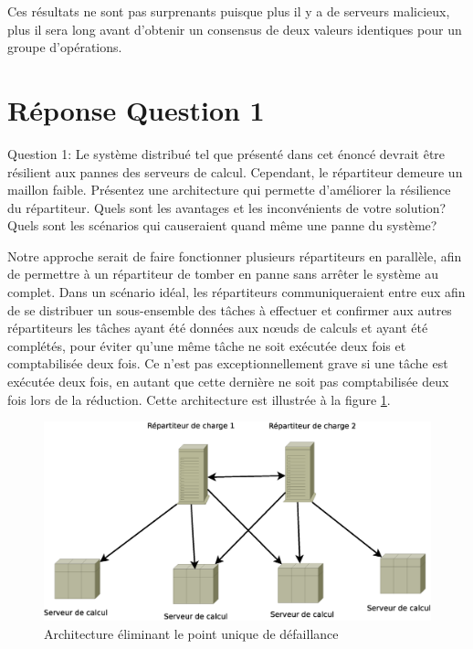 Ces résultats ne sont pas surprenants puisque plus il y a de serveurs malicieux, plus il sera long avant
d'obtenir un consensus de deux valeurs identiques pour un groupe d'opérations. 




\section{Réponse Question 1}
Question 1: Le système distribué tel que présenté dans cet énoncé devrait être résilient aux pannes
des serveurs de calcul. Cependant, le répartiteur demeure un maillon faible. Présentez une
architecture qui permette d'améliorer la résilience du répartiteur. Quels sont les avantages et les
inconvénients de votre solution? Quels sont les scénarios qui causeraient quand même une panne du
système?

Notre approche serait de faire fonctionner plusieurs répartiteurs en parallèle, afin de permettre à 
un répartiteur de tomber en panne sans arrêter le système au complet. Dans un scénario idéal, les répartiteurs 
communiqueraient entre eux afin de se distribuer un sous-ensemble des tâches à effectuer et confirmer aux autres répartiteurs 
les tâches ayant été données aux nœuds de calculs et ayant été complétés, pour éviter qu'une même tâche ne soit exécutée deux fois
et comptabilisée deux fois. Ce n'est pas exceptionnellement grave si une tâche est exécutée deux fois, en autant que cette dernière ne soit 
pas comptabilisée deux fois lors de la réduction. Cette architecture est illustrée à la figure  \ref{fig:arch_2}.

\begin{figure}
  \includegraphics[width=\linewidth]{Arch_2.eps}
  \caption{Architecture éliminant le point unique de défaillance}
  \label{fig:arch_2}
\end{figure}

